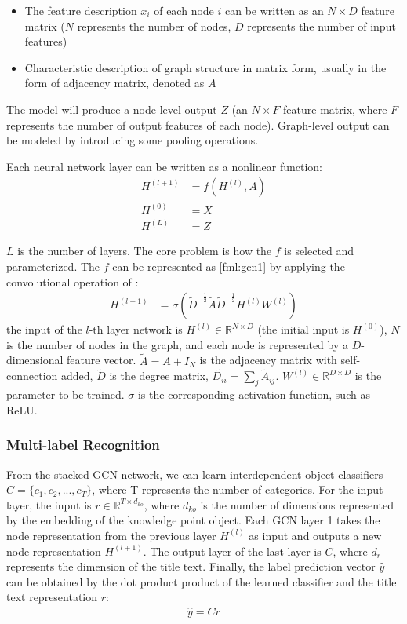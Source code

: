 \begin{itemize}
	\item The feature description $x_i$ of each node $i$ can be written as an $N\times D$ feature matrix ($N$ represents the number of nodes, $D$ represents the number of input features)
	\item Characteristic description of graph structure in matrix form, usually in the form of adjacency matrix, denoted as $A$
\end{itemize}

The model will produce a node-level output $Z$ (an $N\times F$ feature matrix, where $F$ represents the number of output features of each node). Graph-level output can be modeled by introducing some pooling operations.

Each neural network layer can be written as a nonlinear function:
\begin{align}
	H^{(l+1)} & =f\left(H^{(l)}, A\right) \\
	H^{(0)}   & =X                        \\
	H^{(L)}   & =Z
\end{align}

$L$ is the number of layers. The core problem is how the $f$ is selected and parameterized. The $f$ can be represented as \ref{fml:gcn1} by applying the convolutional operation of \cite{kipf2016semi}:
\begin{align}
	H^{(l+1)} & =\sigma\left(\tilde{D}^{-\frac{1}{2}} \tilde{A} \tilde{D}^{-\frac{1}{2}} H^{(l)} W^{(l)}\right)\label{fml:gcn1}
\end{align}
the input of the $l$-th layer network is $H^{(l)}\in \mathbb{R}^{N\times D}$ (the initial input is $H^{(0)}$), $N$ is the number of nodes in the graph, and each node is represented by a $D$-dimensional feature vector. $\tilde{A}=A+I_N$ is the adjacency matrix with self-connection added, $\tilde{D}$ is the degree matrix, $\tilde{D_{ii}}=\sum_{j}{\tilde{A}_{ij}}$. $W^{(l)}\in \mathbb{R}^{D\times D}$ is the parameter to be trained. $\sigma$ is the corresponding activation function, such as ReLU.

\subsubsection{Multi-label Recognition}
From the stacked GCN network, we can learn interdependent object classifiers $C=\{c_1,c_2,...,c_T\}$, where T represents the number of categories. For the input layer, the input is $r\in \mathbb{R}^{T \times d_{ko}}$, where $d_{ko}$ is the number of dimensions represented by the embedding of the knowledge point object. Each GCN layer 1 takes the node representation from the previous layer $H^{(l)}$ as input and outputs a new node representation $H^{(l+1)}$. The output layer of the last layer is $C$, where $d_r$ represents the dimension of the title text. Finally, the label prediction vector  $\hat{y}$ can be obtained by the dot product product of the learned classifier and the title text representation $r$:
\begin{align}
	\hat{y} = C r
\end{align}

